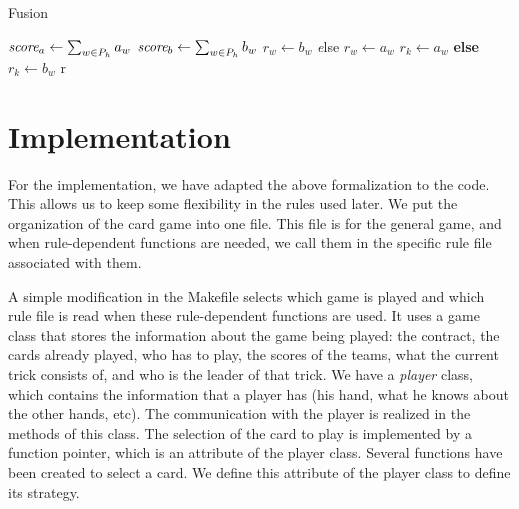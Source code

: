 \documentclass[runningheads]{llncs}
\begin{document}
\begin{algorithm}
\caption{Fusion}
\label{algo:perm}
\begin{algorithmic}
        \State $\mbox{\em score}_a \gets \sum_{w \in P_h}a_w$
        \State $\mbox{\em score}_b \gets \sum_{w \in P_h}b_w$
                 $r_w \gets b_w$
                {\emph else}
                     $r_w \gets a_w$
                \EndIf
            \EndFor
        \Else
                 $r_k \gets a_w$
                {\bf else}
                 $r_k \gets b_w$
                \EndIf
            \EndFor
        \EndIf
    \EndFor
    \State \Return r
\EndFunction
\end{algorithmic}
\end{algorithm}


\section{Implementation}

For the implementation, we have adapted the above formalization to the code. This allows us to keep some flexibility in the rules used later. We put the organization of the card game into one file. This file is for the general game, and when rule-dependent functions are needed, we call them in the specific rule file associated with them.

A simple modification in the Makefile selects which game is played and which rule file is read when these rule-dependent functions are used. It uses a game class that stores the information about the game being played: the contract, the cards already played, who has to play, the scores of the teams, what the current trick consists of, and who is the leader of that trick. We have a \emph{player} class, which contains the information that a player has (his hand, what he knows about the other hands, etc). The communication with the player is realized in the methods of this class. The selection of the card to play is implemented by a function pointer, which is an attribute of the player class. Several functions have been created to select a card. We define this attribute of the player class to define its strategy. 
\end{document}
